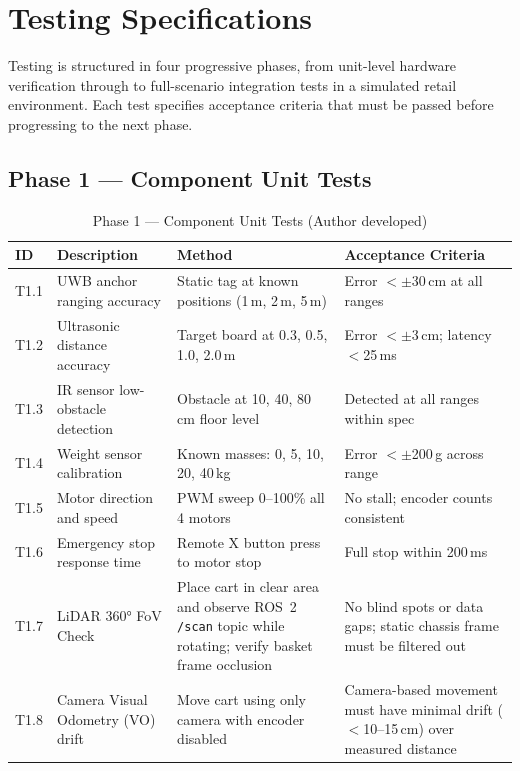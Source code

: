 \section{Testing Specifications}

Testing is structured in four progressive phases, from unit-level hardware
verification through to full-scenario integration tests in a simulated
retail environment. Each test specifies acceptance criteria that must be
passed before progressing to the next phase.

\subsection{Phase 1 --- Component Unit Tests}

\begin{table}[!ht]
\caption{Phase 1 --- Component Unit Tests (Author developed)}
\label{tab:phase1}
\centering
\footnotesize
\begin{tabular}{p{0.6cm} p{1.8cm} p{1.8cm} p{2.4cm}}
\toprule
\textbf{ID} & \textbf{Description} & \textbf{Method} & \textbf{Acceptance Criteria} \\
\midrule
T1.1 & UWB anchor ranging accuracy & Static tag at known positions (1\,m, 2\,m, 5\,m) & Error $<\pm$30\,cm at all ranges \\
T1.2 & Ultrasonic distance accuracy & Target board at 0.3, 0.5, 1.0, 2.0\,m & Error $<\pm$3\,cm; latency $<$25\,ms \\
T1.3 & IR sensor low-obstacle detection & Obstacle at 10, 40, 80\,cm floor level & Detected at all ranges within spec \\
T1.4 & Weight sensor calibration & Known masses: 0, 5, 10, 20, 40\,kg & Error $<\pm$200\,g across range \\
T1.5 & Motor direction and speed & PWM sweep 0--100\% all 4 motors & No stall; encoder counts consistent \\
T1.6 & Emergency stop response time & Remote X button press to motor stop & Full stop within 200\,ms \\
T1.7 & LiDAR 360° FoV Check & Place cart in clear area and observe ROS~2 \texttt{/scan} topic while rotating; verify basket frame occlusion & No blind spots or data gaps; static chassis frame must be filtered out \\
T1.8 & Camera Visual Odometry (VO) drift & Move cart using only camera with encoder disabled & Camera-based movement must have minimal drift ($<$10--15\,cm) over measured distance \\
\bottomrule
\end{tabular}
\end{table}

